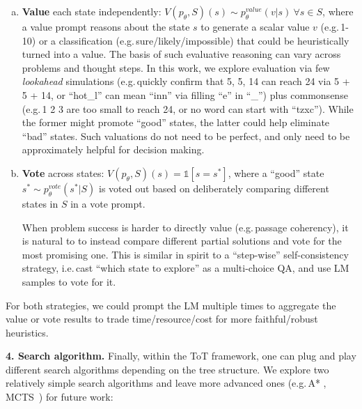 \begin{enumerate}[(a)]
    \item 

    \textbf{Value} each state independently: $V(p_\theta, S)(s) \sim p_\theta^{value}(v|s) \ \forall s \in S$, where a value prompt reasons about the state $s$ to generate a scalar value $v$ (e.g.\,1-10) or a classification (e.g.\,sure/likely/impossible) that could be heuristically turned into a value. The basis of such evaluative reasoning can vary across problems and thought steps. In this work, we explore evaluation via few \textit{lookahead} simulations (e.g.\,quickly confirm that 5, 5, 14 can reach 24 via 5 + 5  + 14, or  ``hot\_l'' can mean ``inn'' via filling ``e'' in ``\_'') plus commonsense (e.g.\,1 2 3 are too small to reach 24, or no word can start with ``tzxc''). While the former might promote ``good'' states, the latter could help eliminate ``bad'' states. Such valuations do not need to be perfect, and only need to be approximately helpful for decision making.

    \item

    \textbf{Vote} across states:  $V(p_\theta, S)(s) = \mathds{1}[s=s^*]$, where a ``good'' state $s^* \sim p_\theta^{vote}(s^*|S)$ is voted out based on deliberately comparing different states in $S$ in a vote prompt. 

    When problem success is harder to directly value (e.g.\,passage coherency), it is natural to to instead compare different partial solutions and vote for the most promising one. This is similar in spirit to a ``step-wise'' self-consistency strategy, i.e.\,cast ``which state to explore'' as a multi-choice QA, and use LM samples to vote for it.

\end{enumerate}

For both strategies, we could prompt the LM multiple times to aggregate the value or vote results to trade time/resource/cost for more faithful/robust heuristics.

\textbf{4. Search algorithm.} Finally, within the ToT framework, one can plug and play different search algorithms depending on the tree structure. We explore two relatively simple search algorithms and leave more advanced ones (e.g.\,A* \cite{hart1968formal}, MCTS~\cite{Browne2012ASO}) for future work:

